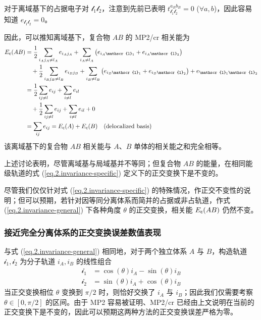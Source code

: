 对于离域基下的占据电子对 $\mathscr{l}_1 \mathscr{l}_2$，注意到先前已表明 $t_{\mathscr{l}_1 \mathscr{l}_2}^{a_B b_B} = 0$ ($\forall a, b$)，因此容易知道 $e_{\mathscr{l}_1 \mathscr{l}_2} = 0$。

因此，可以推知离域基下，复合物 $AB$ 的 MP2/cr 相关能为
\begin{align*}
  E_\textmt{c} (AB) &= \frac{1}{2} \sum_{i_A j_A \neq l_A} e_{i_A j_A} + \sum_{i_A \neq l_A} \big( e_{i_A \mathscr{l}_1} + e_{i_A \mathscr{l}_2} \big) \\
  &\quad + \frac{1}{2} \sum_{i_B j_B \neq l_B} e_{i_B j_B} + \sum_{i_B \neq l_B} \big( e_{i_B \mathscr{l}_1} + e_{i_B \mathscr{l}_2} \big) + e_{\mathscr{l}_1 \mathscr{l}_2} \\
  &= \frac{1}{2} \sum_{ij \neq l} e_{ij} + \sum_{i \neq l} e_{il} \\
  &\quad + \frac{1}{2} \sum_{ij \neq l} e_{ij} + \sum_{i \neq l} e_{il} + 0 \\
  &= \sum_{ij} e_{ij} = E_\textmt{c} (A) + E_\textmt{c} (B) \quad \text{(delocalized basis)}
\end{align*}
该离域基下的复合物 $AB$ 相关能与 $A$、$B$ 单体的相关能之和完全相等。

上述讨论表明，尽管离域基与局域基并不等同；但复合物 $AB$ 的能量，在相同能级轨道的式 (\ref{eq.2.invariance-specific}) 定义下的正交变换下是不变的。

尽管我们仅仅针对式 (\ref{eq.2.invariance-specific}) 的特殊情况，作正交不变性的说明；但可以预期，若针对因等同分离体系而简并的占据或非占轨道，作式 (\ref{eq.2.invariance-general}) 下各种角度 $\theta$ 的正交变换，相关能 $E_{\textsf{c}} (AB)$ 仍然不变。

\subsubsection{接近完全分离体系的正交变换误差数值表现}

与式 (\ref{eq.2.invariance-general}) 相同地，对于两个独立体系 $A$ 与 $B$，构造轨道 $\mathscr{i}_1, \mathscr{i}_2$ 为分子轨道 $i_A, i_B$ 的线性组合
\begin{align*}
  \mathscr{i}_1 &= \cos(\theta) i_A - \sin(\theta) i_B \\
  \mathscr{i}_2 &= \sin(\theta) i_A + \cos(\theta) i_B
\end{align*}
当正交变换相位 $\theta$ 变换到 $\pi/2$ 时，则恰好交换了 $i_A$ 与 $i_B$；因此我们仅需要考察 $\theta \in [0, \pi/2]$ 的区间。由于 MP2 容易被证明、MP2/cr 已经由上文说明在当前的正交变换下是不变的，因此可以预期这两种方法的正交变换误差严格为零。

